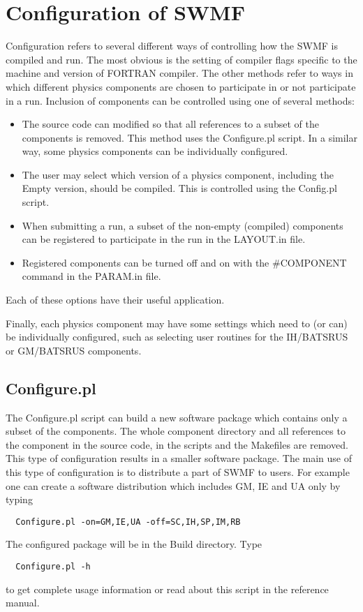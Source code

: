 \section{Configuration of SWMF}

Configuration refers to several different ways of controlling how the 
SWMF is compiled and run.  The most obvious is the setting of
compiler flags specific to the machine and version of FORTRAN
compiler.  The other methods refer to ways in which different physics
components are chosen to participate in or not participate in a run.
Inclusion of components can be controlled using one of several methods:

\begin{itemize}
\item The source code can modified so that all references %
      to a subset of the components is removed. %
      This method uses the Configure.pl script. %
      In a similar way, some physics components can be individually
      configured.
\item The user may select which version of a physics component,
  including the Empty version,
      should be compiled.  This is controlled using the Config.pl script.
\item When submitting a run, a subset of the non-empty (compiled) 
      components can be
      registered to participate in the run in the LAYOUT.in file.
\item Registered components can be turned off and on with the \#COMPONENT
      command in the PARAM.in file.
\end{itemize}
Each of these options have their useful application.

Finally, each physics component may have some settings which need to
(or can) be individually
configured, such as selecting user routines for the IH/BATSRUS or
GM/BATSRUS components.

\subsection{Configure.pl}
The Configure.pl script can build a new software package which
contains only a subset of the components. The whole
component directory and all references to the component 
in the source code, in the scripts and the Makefiles are removed.
This type of configuration results in a smaller software package.
The main use of this type of configuration is to distribute
a part of SWMF to users. For example one can create a 
software distribution which includes GM, IE and UA only by typing
\begin{verbatim}
  Configure.pl -on=GM,IE,UA -off=SC,IH,SP,IM,RB
\end{verbatim}
The configured package will be in the Build directory.  Type
\begin{verbatim}
  Configure.pl -h
\end{verbatim}
to get complete usage information or read about this script 
in the reference manual.


